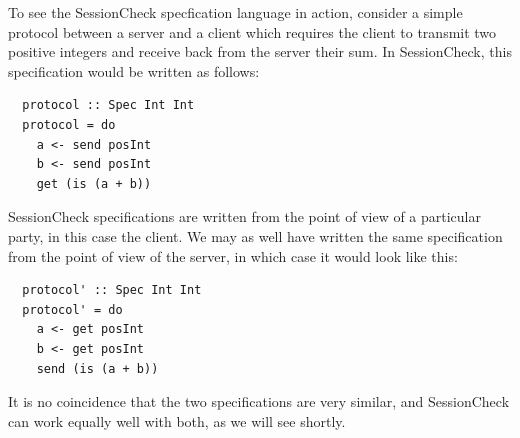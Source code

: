 \documentclass{article}
\begin{document}
To see the SessionCheck specfication language in action, consider a
simple protocol between a server and a client which requires the
client to transmit two positive integers and receive back from the
server their sum.
%
In SessionCheck, this specification would be written as follows:
%

\begin{verbatim}
  protocol :: Spec Int Int
  protocol = do
    a <- send posInt
    b <- send posInt
    get (is (a + b))
\end{verbatim}

%
SessionCheck specifications are written from the point of view of a particular party, in this case the client.
%
We may as well have written the same specification from the point of view of the server,
in which case it would look like this:
%

\begin{verbatim}
  protocol' :: Spec Int Int
  protocol' = do
    a <- get posInt
    b <- get posInt
    send (is (a + b))
  \end{verbatim}

%
It is no coincidence that the two specifications are very similar, and SessionCheck can work equally well with
both, as we will see shortly.
\end{document}
